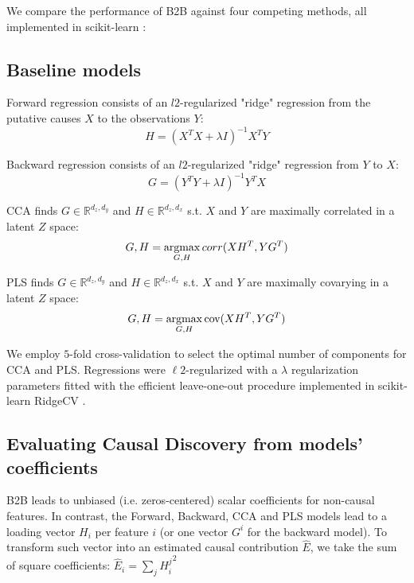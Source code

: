 We compare the performance of B2B against four competing methods, all
implemented in scikit-learn \citep{sklearn}:
%

\subsection{Baseline models}

Forward regression consists of an $l2$-regularized "ridge" regression from the
putative causes $X$ to the observations $Y$: \begin{equation} H = (X^T X
+\lambda I)^{-1} X^T Y \end{equation}

Backward regression consists of an $l2$-regularized "ridge" regression from $Y$
to $X$: \begin{equation} G = (Y^T Y +\lambda I)^{-1} Y^T X \end{equation}

CCA finds $G\in\mathbb{R}^{d_z, d_y}$ and $H\in\mathbb{R}^{d_z, d_x}$
s.t.
$X$ and $Y$ are maximally correlated in a latent $Z$ space:
\begin{equation} G,H = \operatorname*{argmax}_{G,H} corr(XH^T, YG^T) \end{equation}

PLS finds $G\in\mathbb{R}^{d_z, d_y}$ and $H\in\mathbb{R}^{d_z, d_x}$
s.t.
$X$ and $Y$ are maximally covarying in a latent $Z$ space:
\begin{equation} G,H = \operatorname*{argmax}_{G,H} \text{cov}(XH^T, YG^T) \end{equation}

We employ $5$-fold cross-validation to select the optimal number of components
for CCA and PLS. Regressions were $\ell2$-regularized with a $\lambda$ regularization
parameters fitted with the efficient leave-one-out procedure implemented in
scikit-learn RidgeCV \citep{sklearn}.

\subsection{Evaluating Causal Discovery from models' coefficients}

B2B leads to unbiased (i.e. zeros-centered) scalar coefficients for non-causal
features. In contrast, the Forward, Backward, CCA and PLS models lead to a
loading vector $H_i$ per feature $i$ (or one vector $G^i$ for the backward
model). To transform such vector into an estimated causal contribution $\hat E$,
we take the sum of square coefficients:
  $\hat E_i = \sum_j {H^j_i}^2 $

